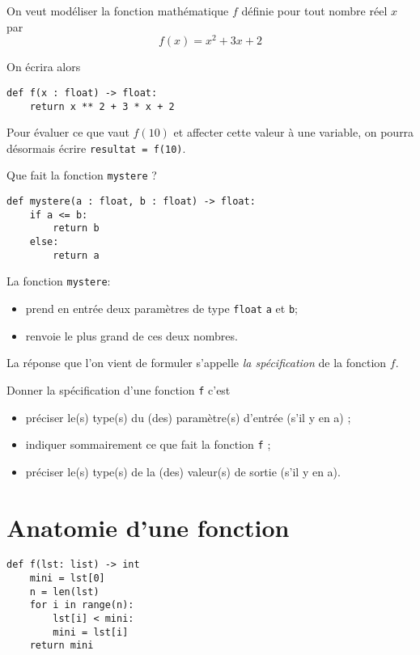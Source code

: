 \begin{exemple}
    On veut modéliser la fonction mathématique $f$ définie pour tout nombre réel $x$ par $$f(x)=x^2+3x +2$$

    On écrira alors

    \begin{verbatim}
def f(x : float) -> float:
    return x ** 2 + 3 * x + 2
            \end{verbatim}

    Pour évaluer ce que vaut $f(10)$ et affecter cette valeur à une variable, on pourra désormais écrire \texttt{resultat = f(10)}.
\end{exemple}


Que fait la fonction \texttt{mystere} ?

\begin{verbatim}
def mystere(a : float, b : float) -> float:
    if a <= b:
        return b
    else:
        return a            
\end{verbatim}



La fonction \texttt{mystere}:
\begin{itemize}
    \item   prend en entrée deux paramètres de type \texttt{float} \texttt{a} et \texttt{b};
    \item   renvoie le plus grand de ces deux nombres.
\end{itemize}

La réponse que l'on vient de formuler s'appelle \textit{la spécification} de la fonction $f$.

\begin{definition}[ : fonction]
    Donner la spécification d'une fonction \texttt{f} c'est
    \begin{itemize}
        \item   préciser le(s) type(s) du (des) paramètre(s) d'entrée (s'il y en a) ;
        \item   indiquer sommairement ce que fait la fonction \texttt{f} ;
        \item   préciser le(s) type(s) de la (des) valeur(s) de sortie (s'il y en a).
    \end{itemize}
\end{definition}

\section{Anatomie d'une fonction}
\begin{pyc}
\begin{verbatim}
def f(lst: list) -> int
    mini = lst[0]
    n = len(lst)
    for i in range(n):
        lst[i] < mini:
        mini = lst[i]
    return mini
   \end{verbatim}
\end{pyc}

